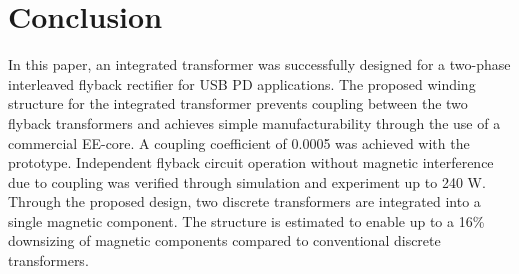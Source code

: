 \documentclass[lettersize,journal]{IEEEtran}
\begin{document}
\section{Conclusion}
In this paper, an integrated transformer was successfully designed for a two-phase interleaved flyback rectifier for USB PD applications. The proposed winding structure for the integrated transformer prevents coupling between the two flyback transformers and achieves simple manufacturability through the use of a commercial EE-core. A coupling coefficient of 0.0005 was achieved with the prototype. Independent flyback circuit operation without magnetic interference due to coupling was verified through simulation and experiment up to 240 W. Through the proposed design, two discrete transformers are integrated into a single magnetic component. The structure is estimated to enable up to a 16\% downsizing of magnetic components compared to conventional discrete transformers.






\end{document}
